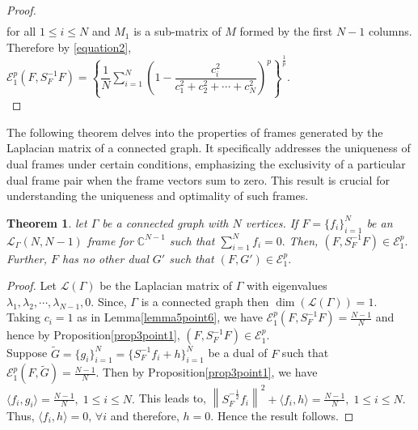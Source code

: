 \documentclass[final,1p,times]{elsarticle}
\newtheorem{thm}{Theorem}[section]
\begin{document}
\begin{proof}
\begin{align*}
	\end{align*}
	for all $ 1 \leq i \leq N$ and 	$M_1$ is a sub-matrix of $M$ formed by the first $N-1$ columns. Therefore by \eqref{equation2},  $\mathcal{E}_{1}^p\left( F, S_{F}^{-1}F \right) = \left\{\dfrac{1}{N} \sum\limits_{i=1}^N \left(1- \dfrac{c_{i}^2}{c_{1}^2 + c_{2}^2 + \cdots + c_{N}^2}\right)^p\right\}^{\frac{1}{p}} .$ \\
	 
\end{proof}




The following theorem delves into the properties of frames generated by the Laplacian matrix of a connected graph. It specifically addresses the uniqueness of dual frames under certain conditions, emphasizing the exclusivity of a particular dual frame pair when the frame vectors sum to zero. This result is crucial for understanding the uniqueness and optimality of such frames.





 
\begin{thm}
	let $\Gamma$ be a connected graph with $N$ vertices. If $F= \{f_i\}_{i=1}^N$ be an $\mathcal{L}_{\Gamma}(N,N-1)$ frame for $\mathbb{C}^{N-1}$ such that $\sum\limits_{i=1}^N f_i = 0.$ Then,   $\left( F, S_{F}^{-1}F \right) \in \mathcal{E}_{1}^p.$ Further, $F$ has no other dual $G'$ such that $(F,G')  \in \mathcal{E}_{1}^p.$
\end{thm}

\begin{proof}
	Let $\mathcal{L}(\Gamma)$ be the Laplacian matrix of $\Gamma$ with eigenvalues $\lambda_1, \lambda_2, \cdots, \lambda_{N-1}, 0.$ Since, $\Gamma$ is a connected graph then $\dim{(\mathcal{L}(\Gamma))} = 1.$ Taking $c_i =1$ as in Lemma\ref{lemma5point6}, we have $\mathcal{E}_{1}^p\left( F, S_{F}^{-1}F \right) = \frac{N-1}{N} $ and hence by Proposition\ref{prop3point1}, $\left( F, S_{F}^{-1}F \right) \in \mathcal{E}_{1}^p.$ \\
	Suppose $\tilde{G} = \{g_i\}_{i=1}^N =  \{S_{F}^{-1}f_i + h\}_{i=1}^N $ be a dual of $F$ such that $\mathcal{E}_{1}^p(F, \tilde{G}) = \frac{N-1}{N}.$ Then by Proposition\ref{prop3point1}, we have $\langle f_i, g_i \rangle = \frac{N-1}{N},\;1 \leq i \leq N.$ This leads to, $\left\|  S_{F}^{-\frac{1}{2}}f_i    \right\|^2 + \langle f_i, h \rangle = \frac{N-1}{N},\;1\leq i \leq N.$ Thus, $\langle f_i, h \rangle = 0,\,\forall i$ and therefore, $h= 0.$ Hence the result follows. 
 \end{proof}
\end{document}
